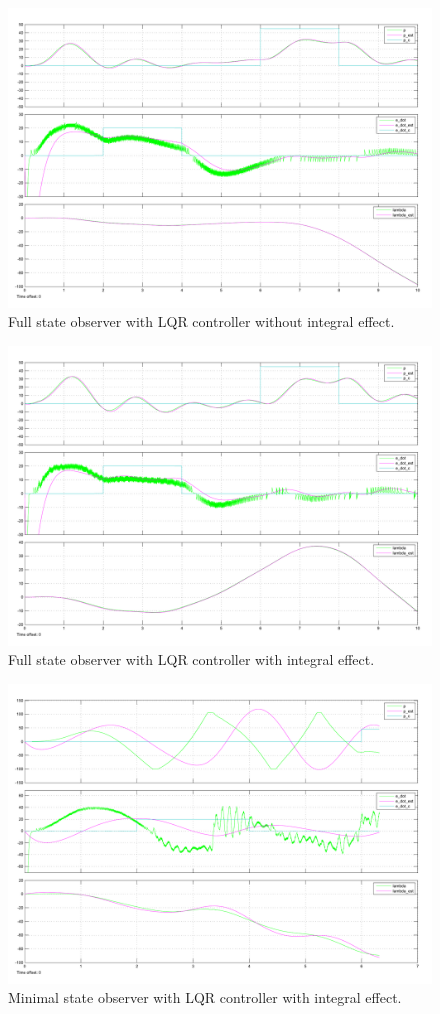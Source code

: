 \begin{figure}[!htb]
	\centering
	\includegraphics[width=\textwidth]{plots/P4p2_EST_without_integral.pdf}
	\caption{Full state observer with LQR controller without integral effect.}
\label{fig:ESTWithoutIntegral}
\end{figure}

\begin{figure}[!htb]
	\centering
	\includegraphics[width=\textwidth]{plots/P4p2_EST_with_integral.pdf}
	\caption{Full state observer with LQR controller with integral effect.}
\label{fig:ESTWithIntegral}
\end{figure}

\begin{figure}[!htb]
	\centering
	\includegraphics[width=\textwidth]{plots/P4p3_EST_not_p.pdf}
	\caption{Minimal state observer with LQR controller with integral effect.}
\label{fig:ESTnotp}
\end{figure}